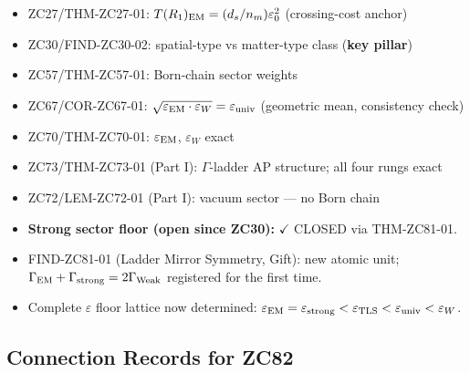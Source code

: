 \documentclass[12pt, a4paper]{article}
\begin{document}
\begin{inheritbox}[title={ZC81 --- Backward Inheritance from Parts A--I}]
\begin{itemize}[noitemsep, leftmargin=1.5em]
  \item ZC27/THM-ZC27-01: $T(R_1)_{\rm EM} = (d_s/n_m)\varepsilon_0^2$
    (crossing-cost anchor)
  \item ZC30/FIND-ZC30-02: spatial-type vs matter-type class
    (\textbf{key pillar})
  \item ZC57/THM-ZC57-01: Born-chain sector weights
  \item ZC67/COR-ZC67-01: $\sqrt{\varepsilon_{\rm EM}\cdot\varepsilon_W}
    = \varepsilon_{\rm univ}$ (geometric mean, consistency check)
  \item ZC70/THM-ZC70-01: $\varepsilon_{\rm EM}$, $\varepsilon_W$ exact
  \item ZC73/THM-ZC73-01 (Part I): $\Gamma$-ladder AP structure;
    all four rungs exact
  \item ZC72/LEM-ZC72-01 (Part I): vacuum sector — no Born chain
\end{itemize}
\end{inheritbox}

\begin{correctionbox}[title={ZC81 --- Forward Corrections / Gap Closures}]
\begin{itemize}[noitemsep, leftmargin=1.5em]
  \item \textbf{Strong sector floor (open since ZC30):}
    \textcolor{crfgreen}{$\checkmark$ CLOSED} via THM-ZC81-01.
  \item FIND-ZC81-01 (Ladder Mirror Symmetry, Gift):
    new atomic unit; $\Gamma_{\rm EM} + \Gamma_{\rm strong}
    = 2\Gamma_{\rm Weak}$ registered for the first time.
  \item Complete $\varepsilon$ floor lattice now determined:
    $\varepsilon_{\rm EM} = \varepsilon_{\rm strong} < \varepsilon_{\rm TLS}
    < \varepsilon_{\rm univ} < \varepsilon_W$.
\end{itemize}
\end{correctionbox}

\subsection{Connection Records for ZC82}
\end{document}
